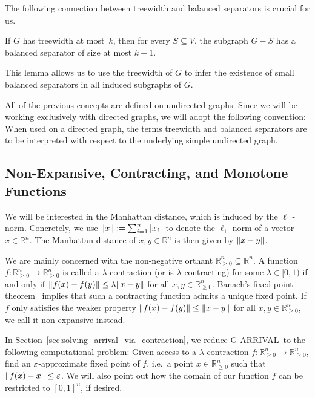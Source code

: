 \documentclass[a4paper,UKenglish,cleveref, autoref, thm-restate]{lipics-v2021}
\newcommand{\R}{\mathbb{R}}
\DeclarePairedDelimiter\norm{\lVert}{\rVert}
\renewcommand{\epsilon}{\ensuremath\varepsilon}
\newcommand{\problem}[1]{\textrm{#1}}
\newcommand{\garrival}{\problem{G-ARRIVAL}}
\begin{document}
The following connection between treewidth and balanced separators is crucial for us.

\begin{lemma}
\label{lemma:existence_balanced_separator}
    If $G$ has treewidth at most~$k$, then for every $S \subseteq V$, the subgraph $G - S$ has a balanced separator of size at most $k + 1$.
\end{lemma}
This lemma allows us to use the treewidth of $G$ to infer the existence of small balanced separators in all induced subgraphs of $G$.

All of the previous concepts are defined on undirected graphs. Since we will be working exclusively with directed graphs, we will adopt the following convention: When used on a directed graph, the terms treewidth and balanced separators are to be interpreted with respect to the underlying simple undirected graph. 

\subsection{Non-Expansive, Contracting, and Monotone Functions}
\label{ssec:contraction_maps}

We will be interested in the Manhattan distance, which is induced by the $\ell_1$-norm. Concretely, we use $\norm{x} := \sum_{i = 1}^n |x_i|$ to denote the $\ell_1$-norm of a vector $x \in \R^n$. The Manhattan distance of $x, y \in \R^n$ is then given by $\norm{x - y}$. 

We are mainly concerned with the non-negative orthant $\R^n_{\geq 0} \subseteq \R^n$. A function $f : \R^n_{\geq 0} \rightarrow \R^n_{\geq 0}$ is called a $\lambda$-contraction (or is $\lambda$-contracting) for some $\lambda \in [0, 1)$ if and only if $\norm{f(x) - f(y)} \leq \lambda \norm{x - y}$ for all $x, y \in \R^n_{\geq 0}$. Banach's fixed point theorem~\cite{banach1922operations} implies that such a contracting function admits a unique fixed point. If $f$ only satisfies the weaker property $\norm{f(x) - f(y)} \leq \norm{x - y}$ for all $x, y \in \R^n_{\geq 0}$, we call it non-expansive instead.

In Section~\ref{sec:solving_arrival_via_contraction}, we reduce \garrival\ to the following computational problem: Given access to a $\lambda$-contraction $f : \R^n_{\geq 0} \rightarrow \R^n_{\geq 0}$, find an $\epsilon$-approximate fixed point of $f$, i.e.\ a point $x \in \R^n_{\geq 0}$ such that $\norm{f(x) - x} \leq \epsilon$. We will also point out how the domain of our function $f$ can be restricted to $[0, 1]^n$, if desired.
\end{document}
